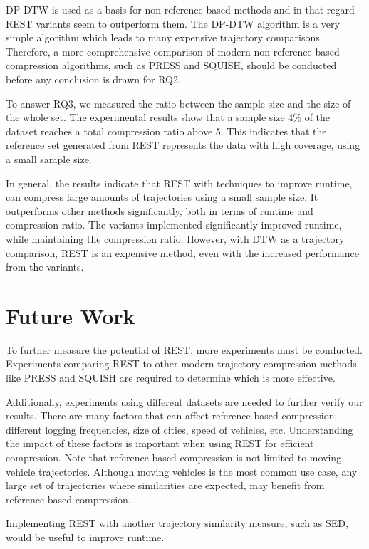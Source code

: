 DP-DTW is used as a basis for non reference-based methods and in that regard REST variants seem to outperform them. The DP-DTW algorithm is a very simple algorithm which leads to many expensive trajectory comparisons. Therefore, a more comprehensive comparison of modern non reference-based compression algorithms, such as PRESS and SQUISH, should be conducted before any conclusion is drawn for RQ2.

To answer RQ3, we measured the ratio between the sample size and the size of the whole set. The experimental results show that a sample size 4\% of the dataset reaches a total compression ratio above 5. This indicates that the reference set generated from REST represents the data with high coverage, using a small sample size.

In general, the results indicate that REST with techniques to improve runtime, can compress large amounts of trajectories using a small sample size. It outperforms other methods significantly, both in terms of runtime and compression ratio. The variants implemented significantly improved runtime, while maintaining the compression ratio. However, with DTW as a trajectory comparison, REST is an expensive method, even with the increased performance from the variants.

\section{Future Work}
To further measure the potential of REST, more experiments must be conducted. Experiments comparing REST to other modern trajectory compression methods like PRESS and SQUISH are required to determine which is more effective.

Additionally, experiments using different datasets are needed to further verify our results. There are many factors that can affect reference-based compression: different logging frequencies, size of cities, speed of vehicles, etc. Understanding the impact of these factors is important when using REST for efficient compression. Note that reference-based compression is not limited to moving vehicle trajectories. Although moving vehicles is the most common use case, any large set of trajectories where similarities are expected, may benefit from reference-based compression.

Implementing REST with another trajectory similarity measure, such as SED, would be useful to improve runtime.
